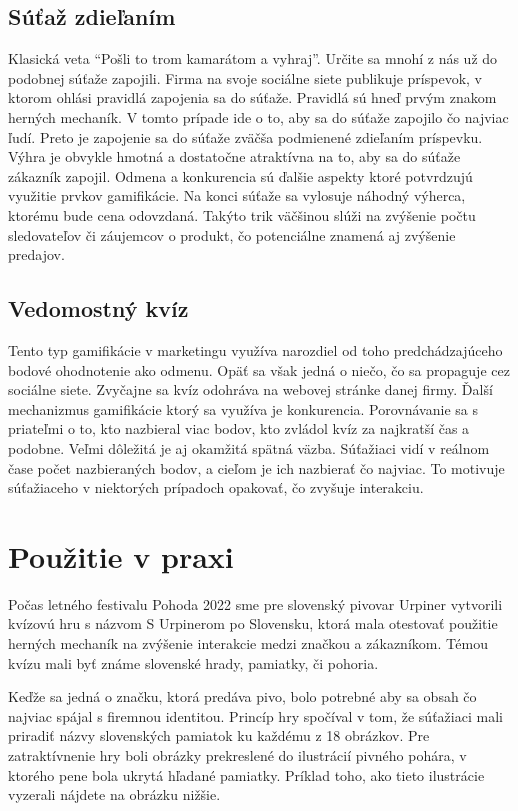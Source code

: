\documentclass[10pt,twoside,slovak,a4paper]{article}
\begin{document}
\subsection{Súťaž zdieľaním}
Klasická veta “Pošli to trom kamarátom a vyhraj”. Určite sa mnohí z nás už do podobnej súťaže zapojili. Firma na svoje sociálne siete publikuje príspevok, v ktorom ohlási pravidlá zapojenia sa do súťaže. Pravidlá sú hneď prvým znakom herných mechaník. V tomto prípade ide o to, aby sa do súťaže zapojilo čo najviac ľudí. Preto je zapojenie sa do súťaže zväčša podmienené zdieľaním príspevku. Výhra je obvykle hmotná a dostatočne atraktívna na to, aby sa do súťaže zákazník zapojil. Odmena a konkurencia sú ďalšie aspekty ktoré potvrdzujú využitie prvkov gamifikácie. Na konci súťaže sa vylosuje náhodný výherca, ktorému bude cena odovzdaná. Takýto trik väčšinou slúži na zvýšenie počtu sledovateľov či záujemcov o produkt, čo potenciálne znamená aj zvýšenie predajov.

\subsection{Vedomostný kvíz}
Tento typ gamifikácie v marketingu využíva narozdiel od toho predchádzajúceho bodové ohodnotenie ako odmenu. Opäť sa však jedná o niečo, čo sa propaguje cez sociálne siete. Zvyčajne sa kvíz odohráva na webovej stránke danej firmy. Ďalší mechanizmus gamifikácie ktorý sa využíva je konkurencia. Porovnávanie sa s priateľmi o to, kto nazbieral viac bodov, kto zvládol kvíz za najkratší čas a podobne. Veľmi dôležitá je aj okamžitá spätná väzba. Súťažiaci vidí v reálnom čase počet nazbieraných bodov, a cieľom je ich nazbierať čo najviac. To motivuje súťažiaceho v niektorých prípadoch opakovať, čo zvyšuje interakciu.

\clearpage
\section{Použitie v praxi}
Počas letného festivalu Pohoda 2022 sme pre slovenský pivovar Urpiner vytvorili kvízovú hru s názvom S Urpinerom po Slovensku, ktorá mala otestovať použitie herných mechaník na zvýšenie interakcie medzi značkou a zákazníkom. Témou kvízu mali byť známe slovenské hrady, pamiatky, či pohoria.

Keďže sa jedná o značku, ktorá predáva pivo, bolo potrebné aby sa obsah čo najviac spájal s firemnou identitou. Princíp hry spočíval v tom, že súťažiaci mali priradiť názvy slovenských pamiatok ku každému z 18 obrázkov. Pre zatraktívnenie hry boli obrázky prekreslené do ilustrácií pivného pohára, v ktorého pene bola ukrytá hľadané pamiatky. Príklad toho, ako tieto ilustrácie vyzerali nájdete na obrázku nižšie.
\end{document}
